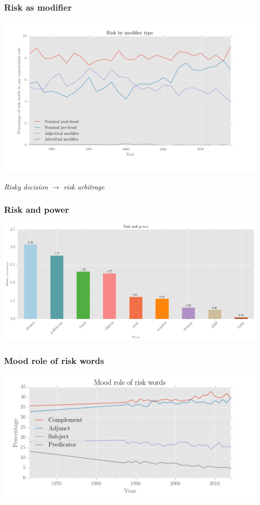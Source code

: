 \documentclass{beamer}       %
\begin{document}
\begin{frame}
    \frametitle{Risk as modifier}
    \centering
    \includegraphics[width=0.99\textwidth]{../images/risk_by_mod_type_colour}

    \noindent \emph{Risky decision} $\rightarrow$ \emph{risk arbitrage}
\end{frame}

\begin{frame}
    \frametitle{Risk and power}
    \centering
    \includegraphics[width=0.99\textwidth]{../images/risk-and-power-2}
\end{frame}

\begin{frame}
    \frametitle{Mood role of risk words}
    \centering
    \includegraphics[width=0.99\textwidth]{../images/mood-role-of-risk-words}
\end{frame}
\end{document}
